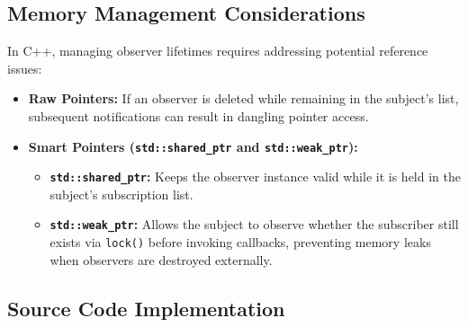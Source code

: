 \documentclass[12pt,a4paper]{article}
\begin{document}
\subsection{Memory Management Considerations}
In C++, managing observer lifetimes requires addressing potential reference issues:
\begin{itemize}
    \item \textbf{Raw Pointers:} If an observer is deleted while remaining in the subject's list, subsequent notifications can result in dangling pointer access.
    \item \textbf{Smart Pointers (\texttt{std::shared\_ptr} and \texttt{std::weak\_ptr}):}
    \begin{itemize}
        \item \textbf{\texttt{std::shared\_ptr}:} Keeps the observer instance valid while it is held in the subject's subscription list.
        \item \textbf{\texttt{std::weak\_ptr}:} Allows the subject to observe whether the subscriber still exists via \texttt{lock()} before invoking callbacks, preventing memory leaks when observers are destroyed externally.
    \end{itemize}
\end{itemize}

\subsection{Source Code Implementation}
\end{document}
